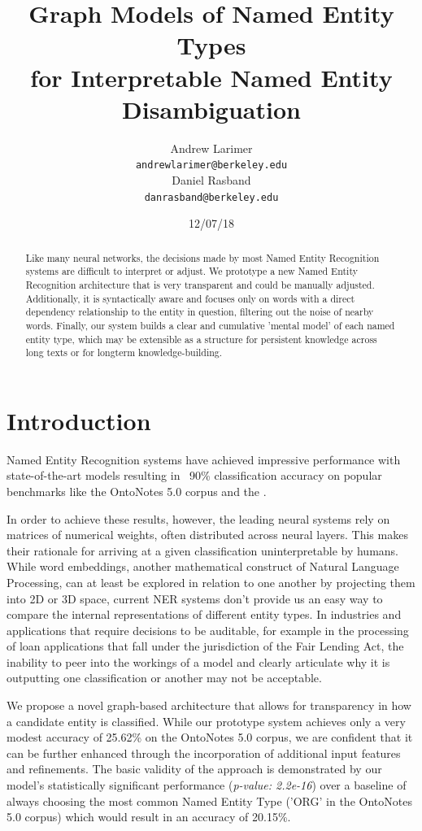 \documentclass[11pt,a4paper]{article}
\title{Graph Models of Named Entity Types\\for Interpretable Named Entity Disambiguation}
\author{Andrew Larimer \\
  {\tt andrewlarimer@berkeley.edu} \\\And
  Daniel Rasband \\
  {\tt danrasband@berkeley.edu} \\}
\date{12/07/18}
\begin{document}
\maketitle
\begin{abstract}
Like many neural networks, the decisions made by most Named Entity Recognition systems are difficult to interpret or adjust. We prototype a new Named Entity Recognition architecture that is very transparent and could be manually adjusted. Additionally, it is syntactically aware and focuses only on words with a direct dependency relationship to the entity in question, filtering out the noise of nearby words. Finally, our system builds a clear and cumulative 'mental model' of each named entity type, which may be extensible as a structure for persistent knowledge across long texts or for longterm knowledge-building.
\end{abstract}

\section{Introduction}
Named Entity Recognition systems have achieved impressive performance with state-of-the-art models resulting in ~90\% classification accuracy on popular benchmarks like the OntoNotes 5.0 corpus and the .

In order to achieve these results, however, the leading neural systems rely on matrices of numerical weights, often distributed across neural layers. This makes their rationale for arriving at a given classification uninterpretable by humans. While word embeddings, another mathematical construct of Natural Language Processing, can at least be explored in relation to one another by projecting them into 2D or 3D space, current NER systems don't provide us an easy way to compare the internal representations of different entity types.  In industries and applications that require decisions to be auditable, for example in the processing of loan applications that fall under the jurisdiction of the Fair Lending Act, the inability to peer into the workings of a model and clearly articulate why it is outputting one classification or another may not be acceptable.

We propose a novel graph-based architecture that allows for transparency in how a candidate entity is classified. While our prototype system achieves only a very modest accuracy of 25.62\% on the OntoNotes 5.0 corpus, we are confident that it can be further enhanced through the incorporation of additional input features and refinements. The basic validity of the approach is demonstrated by our model's statistically significant performance (\textit{p-value: 2.2e-16}) over a baseline of always choosing the most common Named Entity Type ('ORG' in the OntoNotes 5.0 corpus) which would result in an accuracy of 20.15\%.
\end{document}
